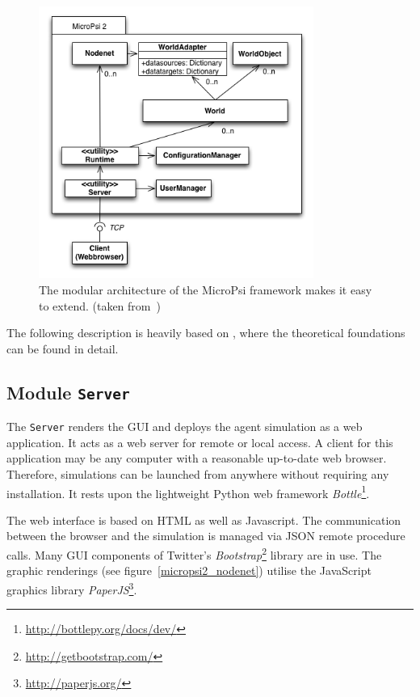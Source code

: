 \begin{figure}[h]
  \centering
    \includegraphics[width=9cm]{graphics/UML_MicroPsi_v14}
  \caption[The modular architecture of the MicroPsi framework]{The modular architecture of the MicroPsi framework makes it easy to extend. (taken from~\cite{conf/agi/Bach12})}
  \label{micropsi2_modules}
\end{figure}

The following description is heavily based on \cite{conf/agi/Bach12}, where the theoretical foundations can be found in detail.

        \subsection{Module \texttt{Server}}
The \texttt{Server} renders the GUI and deploys the agent simulation as a web application. It acts as a web server for remote or local access. A client for this application may be any computer with a reasonable up-to-date web browser. Therefore, simulations can be launched from anywhere without requiring any installation. It rests upon the lightweight Python web framework \emph{Bottle}\footnote{\url{http://bottlepy.org/docs/dev/}}.

The web interface is based on HTML as well as Javascript. The communication between the browser and the simulation is managed via JSON remote procedure calls. Many GUI components of Twitter's \emph{Bootstrap}\footnote{\url{http://getbootstrap.com/}} library are in use. The graphic renderings (see figure~\ref{micropsi2_nodenet}) utilise the JavaScript graphics library \emph{PaperJS}\footnote{\url{http://paperjs.org/}}. 

